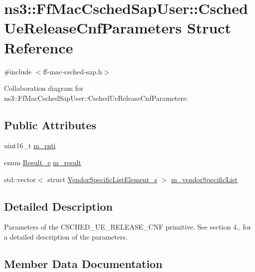 \hypertarget{structns3_1_1FfMacCschedSapUser_1_1CschedUeReleaseCnfParameters}{}\section{ns3\+:\+:Ff\+Mac\+Csched\+Sap\+User\+:\+:Csched\+Ue\+Release\+Cnf\+Parameters Struct Reference}
\label{structns3_1_1FfMacCschedSapUser_1_1CschedUeReleaseCnfParameters}


{\ttfamily \#include $<$ff-\/mac-\/csched-\/sap.\+h$>$}



Collaboration diagram for ns3\+:\+:Ff\+Mac\+Csched\+Sap\+User\+:\+:Csched\+Ue\+Release\+Cnf\+Parameters\+:
\subsection*{Public Attributes}
\begin{DoxyCompactItemize}
\item 
uint16\+\_\+t \hyperlink{structns3_1_1FfMacCschedSapUser_1_1CschedUeReleaseCnfParameters_ac2230202bdd83c844ed7d2432f0e586d}{m\+\_\+rnti}
\item 
enum \hyperlink{namespacens3_a7acf2b7f9e0781dfe43a6bc54d6ecd07}{Result\+\_\+e} \hyperlink{structns3_1_1FfMacCschedSapUser_1_1CschedUeReleaseCnfParameters_ad75458390f83168e277335a1490ed8ff}{m\+\_\+result}
\item 
std\+::vector$<$ struct \hyperlink{structns3_1_1VendorSpecificListElement__s}{Vendor\+Specific\+List\+Element\+\_\+s} $>$ \hyperlink{structns3_1_1FfMacCschedSapUser_1_1CschedUeReleaseCnfParameters_a5e88906ac051b170b6e315d9d5393338}{m\+\_\+vendor\+Specific\+List}
\end{DoxyCompactItemize}


\subsection{Detailed Description}
Parameters of the C\+S\+C\+H\+E\+D\+\_\+\+U\+E\+\_\+\+R\+E\+L\+E\+A\+S\+E\+\_\+\+C\+NF primitive. See section 4.. for a detailed description of the parameters. 

\subsection{Member Data Documentation}
